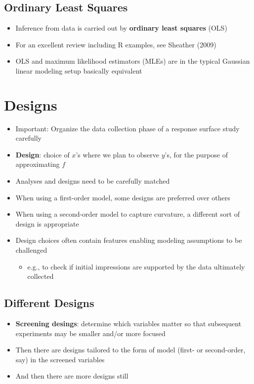 \documentclass[
  letterpaper,
  DIV=11,
  numbers=noendperiod]{scrreprt}
\providecommand{\tightlist}{%
  \setlength{\itemsep}{0pt}\setlength{\parskip}{0pt}}\usepackage{longtable,booktabs,array}
\begin{document}
\subsection{Ordinary Least Squares}\label{ordinary-least-squares}

\begin{itemize}
\tightlist
\item
  Inference from data is carried out by \textbf{ordinary least squares}
  (OLS)
\item
  For an excellent review including R examples, see Sheather (2009)
\item
  OLS and maximum likelihood estimators (MLEs) are in the typical
  Gaussian linear modeling setup basically equivalent
\end{itemize}

\section{Designs}\label{designs}

\begin{itemize}
\tightlist
\item
  Important: Organize the data collection phase of a response surface
  study carefully
\item
  \textbf{Design}: choice of \(x\)'s where we plan to observe \(y\)'s,
  for the purpose of approximating \(f\)
\item
  Analyses and designs need to be carefully matched
\item
  When using a first-order model, some designs are preferred over others
\item
  When using a second-order model to capture curvature, a different sort
  of design is appropriate
\item
  Design choices often contain features enabling modeling assumptions to
  be challenged

  \begin{itemize}
  \tightlist
  \item
    e.g., to check if initial impressions are supported by the data
    ultimately collected
  \end{itemize}
\end{itemize}

\subsection{Different Designs}\label{different-designs}

\begin{itemize}
\tightlist
\item
  \textbf{Screening desings}: determine which variables matter so that
  subsequent experiments may be smaller and/or more focused
\item
  Then there are designs tailored to the form of model (first- or
  second-order, say) in the screened variables
\item
  And then there are more designs still
\end{itemize}
\end{document}
